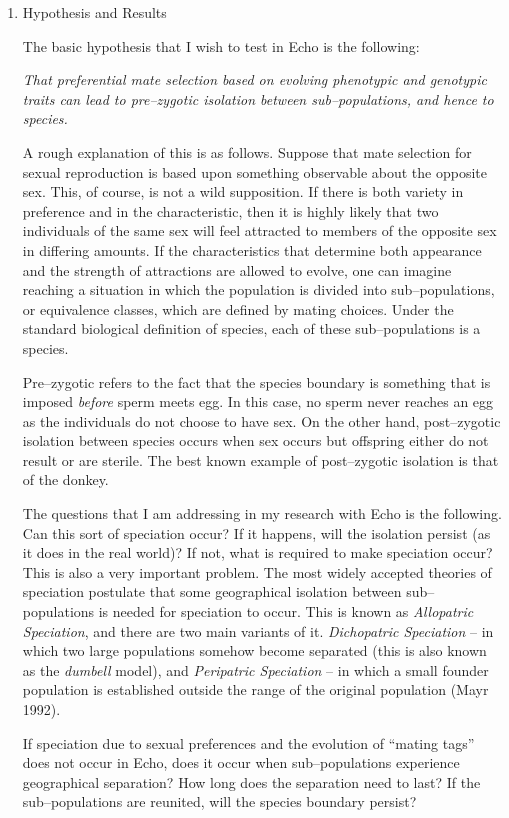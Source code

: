 \begin{enumerate}
\item Hypothesis and Results

The basic hypothesis that I wish to test in Echo is the following:

{\em That preferential mate selection based on evolving phenotypic and
genotypic traits can lead to pre--zygotic isolation between
sub--populations, and hence to species.}

A rough explanation of this is as follows. Suppose that mate selection
for sexual reproduction is based upon something observable about the
opposite sex. This, of course, is not a wild supposition. If there is
both variety in preference and in the characteristic, then it is
highly likely that two individuals of the same sex will feel attracted
to members of the opposite sex in differing amounts. If the
characteristics that determine both appearance and the strength of
attractions are allowed to evolve, one can imagine reaching a
situation in which the population is divided into sub--populations, or
equivalence classes, which are defined by mating choices. Under the
standard biological definition of species, each of these
sub--populations is a species.

Pre--zygotic refers to the fact that the species boundary is something
that is imposed {\em before} sperm meets egg. In this case, no sperm
never reaches an egg as the individuals do not choose to have sex. On
the other hand, post--zygotic isolation between species occurs when
sex occurs but offspring either do not result or are sterile. The
best known example of post--zygotic isolation is that of the donkey.

The questions that I am addressing in my research with Echo is the
following. Can this sort of speciation occur? If it happens, will the
isolation persist (as it does in the real world)? If not, what is
required to make speciation occur? This is also a very important
problem. The most widely accepted theories of speciation postulate
that some geographical isolation between sub--populations is needed
for speciation to occur. This is known as {\em Allopatric Speciation},
and there are two main variants of it. {\em Dichopatric Speciation} --
in which two large populations somehow become separated (this is also
known as the {\em dumbell} model), and {\em Peripatric Speciation} --
in which a small founder population is established outside the range
of the original population (Mayr 1992).

If speciation due to sexual preferences and the evolution of ``mating
tags'' does not occur in Echo, does it occur when sub--populations
experience geographical separation? How long does the separation need
to last? If the sub--populations are reunited, will the species
boundary persist?


\end{enumerate}
